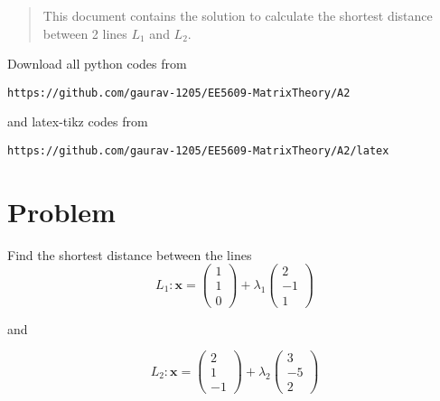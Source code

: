 \documentclass[journal,12pt,twocolumn]{IEEEtran}
\begin{document}
%
\begin{abstract}
This document contains the solution to calculate the shortest distance between 2 lines $L_1$ and $L_2$.
\end{abstract}
Download all python codes from 
%
\begin{lstlisting}
https://github.com/gaurav-1205/EE5609-MatrixTheory/A2
\end{lstlisting}
%
and latex-tikz codes from 
%
\begin{lstlisting}
https://github.com/gaurav-1205/EE5609-MatrixTheory/A2/latex
\end{lstlisting}
%
\section{Problem}

 Find the shortest distance between the lines
 \begin{equation}
     L_1 :  \mathbf{x} = \begin{pmatrix}
1 \\ 
1 \\ 
0 
\end{pmatrix} + \lambda_1 \begin{pmatrix}
2 \\ 
-1 \\ 
1 
\end{pmatrix}
 \end{equation}
 
 and 
 
 \begin{equation}
L_2 :  \mathbf{x} = \begin{pmatrix}
2 \\ 
1 \\ 
-1 
\end{pmatrix} + \lambda_2 \begin{pmatrix}
3 \\ 
-5 \\ 
2 
\end{pmatrix}
 \end{equation}
\end{document}
